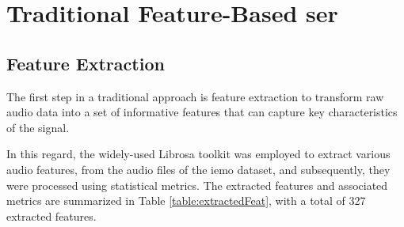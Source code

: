 \section{Traditional Feature-Based \ac{ser}}


\subsection{Feature Extraction}

The first step in a traditional approach is feature extraction to transform raw audio data into a set of informative features that can capture key characteristics of the signal.

In this regard, the widely-used Librosa toolkit was employed to extract various audio features, from the audio files of the \ac{iemo} dataset, and subsequently, they were processed using statistical metrics. The extracted features and associated metrics are summarized in Table \ref{table:extractedFeat}, with a total of 327 extracted features.

